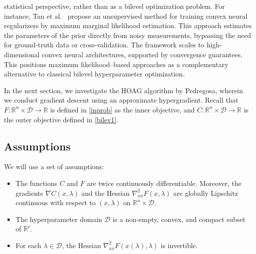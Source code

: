 \documentclass[11pt, twoside]{report}
\begin{document}
statistical perspective, rather than as a bilevel optimization problem. For instance, Tan et al.~\cite{tan2024unsupervised} propose an unsupervised method for training convex neural regularizers by maximum marginal likelihood estimation. This approach estimates the parameters of the prior directly from noisy measurements, bypassing the need for ground-truth data or cross-validation. The framework scales to high-dimensional convex neural architectures, supported by convergence guarantees. This positions maximum likelihood--based approaches as a complementary alternative to classical bilevel hyperparameter optimization.

In the next section, we investigate the HOAG algorithm by Pedregosa, wherein we conduct gradient descent using an approximate hypergradient. Recall that $F : \mathbb{R}^n \times \mathcal{D} \to \mathbb{R}$ is defined in \eqref{inprob} as the inner objective, and $C : \mathbb{R}^n \times \mathcal{D} \to \mathbb{R}$ is the outer objective defined in \eqref{bilev1}.

\subsection{Assumptions}

We will use a set of assumptions:
\begin{itemize}
    \item The functions $C$ and $F$ are twice continuously differentiable. 
    Moreover, the gradients $\nabla C(x,\lambda)$ and the Hessian 
    $\nabla_{xx}^2 F(x,\lambda)$ are globally Lipschitz continuous 
    with respect to $(x,\lambda)$ on 
    $\mathbb{R}^n \times \mathcal{D}$.

    \item The hyperparameter domain $\mathcal{D}$ is a non-empty, convex, 
    and compact subset of $\mathbb{R}^r$.

    \item For each $\lambda \in \mathcal{D}$, the Hessian 
    $\nabla_{xx}^2 F(x(\lambda),\lambda)$ is invertible.
\end{itemize}
\end{document}

